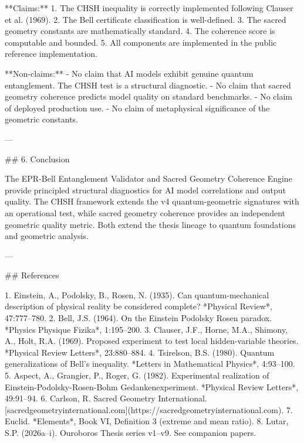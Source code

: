 **Claims:**
1. The CHSH inequality is correctly implemented following Clauser et al. (1969).
2. The Bell certificate classification is well-defined.
3. The sacred geometry constants are mathematically standard.
4. The coherence score is computable and bounded.
5. All components are implemented in the public reference implementation.

**Non-claims:**
- No claim that AI models exhibit genuine quantum entanglement. The CHSH test is a structural diagnostic.
- No claim that sacred geometry coherence predicts model quality on standard benchmarks.
- No claim of deployed production use.
- No claim of metaphysical significance of the geometric constants.

---

## 6. Conclusion

The EPR-Bell Entanglement Validator and Sacred Geometry Coherence Engine provide principled structural diagnostics for AI model correlations and output quality. The CHSH framework extends the v4 quantum-geometric signatures with an operational test, while sacred geometry coherence provides an independent geometric quality metric. Both extend the thesis lineage to quantum foundations and geometric analysis.

---

## References

1. Einstein, A., Podolsky, B., Rosen, N. (1935). Can quantum-mechanical description of physical reality be considered complete? *Physical Review*, 47:777--780.
2. Bell, J.S. (1964). On the Einstein Podolsky Rosen paradox. *Physics Physique Fizika*, 1:195--200.
3. Clauser, J.F., Horne, M.A., Shimony, A., Holt, R.A. (1969). Proposed experiment to test local hidden-variable theories. *Physical Review Letters*, 23:880--884.
4. Tsirelson, B.S. (1980). Quantum generalizations of Bell's inequality. *Letters in Mathematical Physics*, 4:93--100.
5. Aspect, A., Grangier, P., Roger, G. (1982). Experimental realization of Einstein-Podolsky-Rosen-Bohm Gedankenexperiment. *Physical Review Letters*, 49:91--94.
6. Carlson, R. Sacred Geometry International. [sacredgeometryinternational.com](https://sacredgeometryinternational.com).
7. Euclid. *Elements*, Book VI, Definition 3 (extreme and mean ratio).
8. Lutar, S.P. (2026a--i). Ouroboros Thesis series v1--v9. See companion papers.
